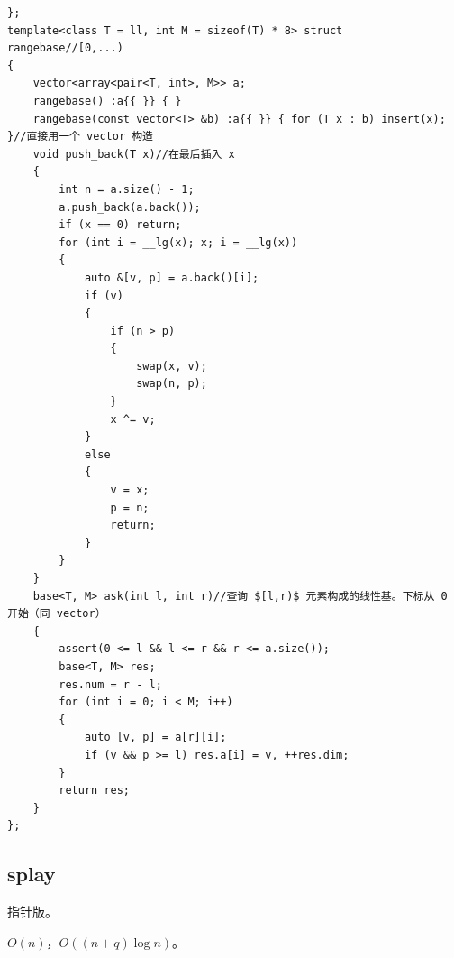 \documentclass[12pt]{ctexart}
\begin{document}
\begin{lstlisting}
};
template<class T = ll, int M = sizeof(T) * 8> struct rangebase//[0,...)
{
	vector<array<pair<T, int>, M>> a;
	rangebase() :a{{ }} { }
	rangebase(const vector<T> &b) :a{{ }} { for (T x : b) insert(x); }//直接用一个 vector 构造
	void push_back(T x)//在最后插入 x
	{
		int n = a.size() - 1;
		a.push_back(a.back());
		if (x == 0) return;
		for (int i = __lg(x); x; i = __lg(x))
		{
			auto &[v, p] = a.back()[i];
			if (v)
			{
				if (n > p)
				{
					swap(x, v);
					swap(n, p);
				}
				x ^= v;
			}
			else
			{
				v = x;
				p = n;
				return;
			}
		}
	}
	base<T, M> ask(int l, int r)//查询 $[l,r)$ 元素构成的线性基。下标从 0 开始（同 vector）
	{
		assert(0 <= l && l <= r && r <= a.size());
		base<T, M> res;
		res.num = r - l;
		for (int i = 0; i < M; i++)
		{
			auto [v, p] = a[r][i];
			if (v && p >= l) res.a[i] = v, ++res.dim;
		}
		return res;
	}
};

\end{lstlisting}

\subsection{splay}

指针版。

$O(n)$，$O((n+q)\log n)$。
\end{document}
